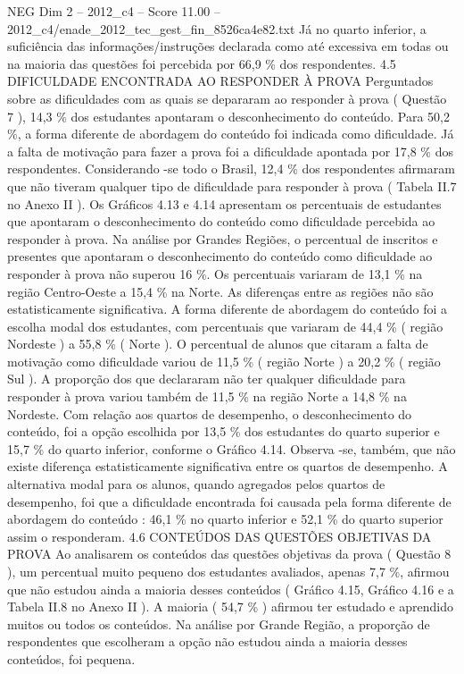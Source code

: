 \begin{textsample}{NEG Dim 2 – 2012\_c4 – Score 11.00 – 2012\_c4/enade\_2012\_tec\_gest\_fin\_8526ca4e82.txt}
Já no quarto inferior, a suficiência das informações/instruções declarada como até excessiva em todas ou na maioria das questões foi percebida por 66,9 \% dos respondentes. 4.5 DIFICULDADE ENCONTRADA AO RESPONDER À PROVA Perguntados sobre as dificuldades com as quais se depararam ao responder à prova ( Questão 7 ), 14,3 \% dos estudantes apontaram o desconhecimento do conteúdo.
Para 50,2 \%, a forma diferente de abordagem do conteúdo foi indicada como dificuldade.
Já a falta de motivação para fazer a prova foi a dificuldade apontada por 17,8 \% dos respondentes.
Considerando -se todo o Brasil, 12,4 \% dos respondentes afirmaram que não tiveram qualquer tipo de dificuldade para responder à prova ( Tabela II.7 no Anexo II ).
Os Gráficos 4.13 e 4.14 apresentam os percentuais de estudantes que apontaram o desconhecimento do conteúdo como dificuldade percebida ao responder à prova.
Na análise por Grandes Regiões, o percentual de inscritos e presentes que apontaram o desconhecimento do conteúdo como dificuldade ao responder à prova não superou 16 \%.
Os percentuais variaram de 13,1 \% na região Centro-Oeste a 15,4 \% na Norte.
As diferenças entre as regiões não são estatisticamente significativa.
A forma diferente de abordagem do conteúdo foi a escolha modal dos estudantes, com percentuais que variaram de 44,4 \% ( região Nordeste ) a 55,8 \% ( Norte ).
O percentual de alunos que citaram a falta de motivação como dificuldade variou de 11,5 \% ( região Norte ) a 20,2 \% ( região Sul ).
A proporção dos que declararam não ter qualquer dificuldade para responder à prova variou também de 11,5 \% na região Norte a 14,8 \% na Nordeste.
Com relação aos quartos de desempenho, o desconhecimento do conteúdo, foi a opção escolhida por 13,5 \% dos estudantes do quarto superior e 15,7 \% do quarto inferior, conforme o Gráfico 4.14.
Observa -se, também, que não existe diferença estatisticamente significativa entre os quartos de desempenho.
A alternativa modal para os alunos, quando agregados pelos quartos de desempenho, foi que a dificuldade encontrada foi causada pela forma diferente de abordagem do conteúdo : 46,1 \% no quarto inferior e 52,1 \% do quarto superior assim o responderam. 4.6 CONTEÚDOS DAS QUESTÕES OBJETIVAS DA PROVA Ao analisarem os conteúdos das questões objetivas da prova ( Questão 8 ), um percentual muito pequeno dos estudantes avaliados, apenas 7,7 \%, afirmou que não estudou ainda a maioria desses conteúdos ( Gráfico 4.15, Gráfico 4.16 e a Tabela II.8 no Anexo II ).
A maioria ( 54,7 \% ) afirmou ter estudado e aprendido muitos ou todos os conteúdos.
Na análise por Grande Região, a proporção de respondentes que escolheram a opção não estudou ainda a maioria desses conteúdos, foi pequena.

\end{textsample}
